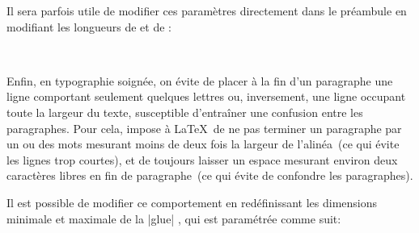 \begin{noprint}
\if@stationery
	\setlength{\parskip}{\baselineskip}
	\setlength{\parindent}{\z@}
\else\if@modern
	\setlength{\parskip}{\baselineskip}
	\setlength{\parindent}{\z@}
\else
	\setlength{\parskip}{\z@}
	\setlength{\parindent}{1.5em}
\fi\fi
\end{noprint}

Il sera parfois utile de modifier ces paramètres directement dans le préambule en modifiant les longueurs de  et de :

\begin{macro}
\setlength{\parskip}{0pt}%
\setlength{\parindent}{1.5em}%
 
\setlength{\parskip}{\baselineskip}%
\setlength{\parindent}{0em}%
\end{macro}

Enfin, en typographie soignée, on évite de placer à la fin d'un paragraphe une ligne comportant seulement quelques lettres ou, inversement, une ligne occupant toute la largeur du texte, susceptible d'entraîner une confusion entre les paragraphes. Pour cela, \frenchlaw impose à \LaTeX\ de ne pas terminer un paragraphe par un ou des mots mesurant moins de deux fois la largeur de l'alinéa~(ce qui évite les lignes trop courtes), et de toujours laisser un espace mesurant environ deux caractères libres en fin de paragraphe~(ce qui évite de confondre les paragraphes).

\begin{noprint}
\setlength{\parfillskip}{2ex plus \dimexpr\linewidth-3em}
\end{noprint}

\begin{developer}
Il est possible de modifier ce comportement en redéfinissant les dimensions minimale et maximale de la |glue| , qui est paramétrée comme suit:\par
\vspace{-\baselineskip}
\begin{macro}
\setlength{\parfillskip}{2ex plus \dimexpr\linewidth -3em}
\end{macro}
\end{developer}


